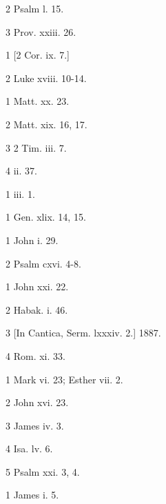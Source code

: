 2
Psalm l. 15.

3
Prov. xxiii. 26.

1
[2 Cor. ix. 7.]

2
Luke xviii. 10-14.

1
Matt. xx. 23.

2
Matt. xix. 16, 17.

3
2 Tim. iii. 7.

4
ii. 37.

1
iii. 1.

1
Gen. xlix. 14, 15.

1
John i. 29.

2
Psalm cxvi. 4-8.

1
John xxi. 22.

2
Habak. i. 46.

3
[In Cantica, Serm. lxxxiv. 2.] 1887.

4
Rom. xi. 33.

1
Mark vi. 23; Esther vii. 2.

2
John xvi. 23.

3
James iv. 3.

4
Isa. lv. 6.

5
Psalm xxi. 3, 4.

1
James i. 5.
